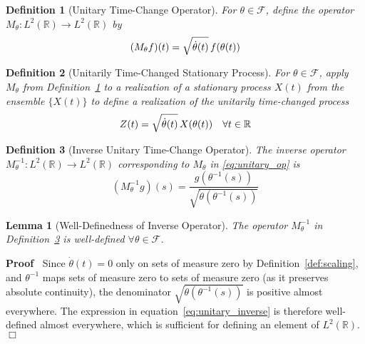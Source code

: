 \documentclass{article}
\newenvironment{proof}{\noindent\textbf{Proof\ }}{\hspace*{\fill}$\Box$\medskip}
\newtheorem{definition}{Definition}
\newtheorem{lemma}{Lemma}
{\theorembodyfont{\rmfamily}\newtheorem{remark}{Remark}}
\begin{document}
\begin{definition}[Unitary Time-Change Operator]
  \label{M}For $\theta \in \mathcal{F}$, define the operator $M_{\theta} : L^2
  (\mathbb{R}) \to L^2 (\mathbb{R})$ by
  \begin{equation}
    \label{eq:unitary_op} (M_{\theta} f) (t) = \sqrt{\dot{\theta} (t)} 
    \hspace{0.17em} f (\theta (t))
  \end{equation}
\end{definition}

\begin{definition}[Unitarily Time-Changed Stationary Process]
  \label{def:time_changed_proc}For $\theta \in \mathcal{F}$, apply
  $M_{\theta}$ from Definition~\ref{M} to a realization of a stationary
  process $X (t)$ from the ensemble $\{X (t)\}$ to define a realization of the
  unitarily time-changed process
  \begin{equation}
    \label{eq:time_change} Z (t) = \sqrt{\dot{\theta} (t)}  \hspace{0.17em} X
    (\theta (t)) \quad \forall t \in \mathbb{R}
  \end{equation}
\end{definition}

\begin{definition}[Inverse Unitary Time-Change Operator]
  \label{def:inverse_unitary_op}The inverse operator $M_{\theta}^{- 1} : L^2
  (\mathbb{R}) \to L^2 (\mathbb{R})$ corresponding to $M_{\theta}$ in
  \eqref{eq:unitary_op} is
  \begin{equation}
    \label{eq:unitary_inverse} (M_{\theta}^{- 1} g) (s) = \frac{g (\theta^{-
    1} (s))}{\sqrt{\dot{\theta} (\theta^{- 1} (s))}}
  \end{equation}
\end{definition}

\begin{lemma}[Well-Definedness of Inverse Operator]
  \label{lem:inverse_well_defined}The operator $M_{\theta}^{- 1}$ in
  Definition~\ref{def:inverse_unitary_op} is well-defined $\forall \theta \in
  \mathcal{F}$.
\end{lemma}

\begin{proof}
  Since $\dot{\theta} (t) = 0$ only on sets of measure zero by
  Definition~\ref{def:scaling}, and $\theta^{- 1}$ maps sets of measure zero
  to sets of measure zero (as it preserves absolute continuity), the
  denominator $\sqrt{\dot{\theta} (\theta^{- 1} (s))}$ is positive almost
  everywhere. The expression in equation~\eqref{eq:unitary_inverse} is
  therefore well-defined almost everywhere, which is sufficient for defining
  an element of $L^2 (\mathbb{R})$.
\end{proof}
\end{document}
